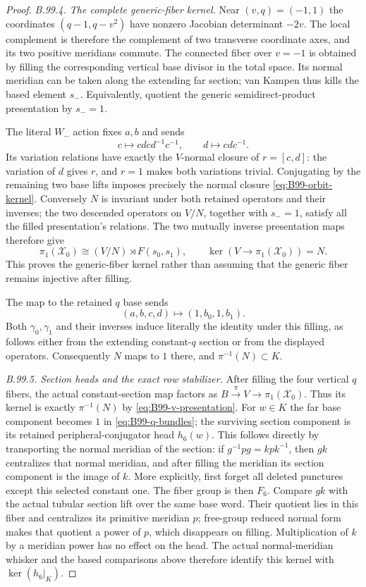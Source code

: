 \begin{proof}
\emph{B.99.4. The complete generic-fiber kernel.}
Near $(v,q)=(-1,1)$ the coordinates
$(q-1,q-v^2)$ have nonzero Jacobian determinant $-2v$.
The local complement is therefore the complement of two transverse
coordinate axes, and its two positive meridians commute.
The connected fiber over $v=-1$ is obtained by filling the corresponding
vertical base divisor in the total space.
Its normal meridian can be taken along the extending far section;
van Kampen thus kills the based element $s_-$.
Equivalently, quotient the generic semidirect-product presentation
by $s_-=1$.

The literal $W_-$ action fixes $a,b$ and sends
\[
 c\longmapsto cdc d^{-1}c^{-1},\qquad
 d\longmapsto cdc^{-1}.
\]
Its variation relations have exactly the $V$-normal closure of
$r=[c,d]$: the variation of $d$ gives $r$, and $r=1$ makes both
variations trivial.
Conjugating by the remaining two base lifts imposes precisely the
normal closure \eqref{eq:B99-orbit-kernel}.
Conversely $N$ is invariant under both retained operators and their
inverses; the two descended operators on $V/N$, together with
$s_-=1$, satisfy all the filled presentation's relations.
The two mutually inverse presentation maps therefore give
\begin{equation}\label{eq:B99-v-presentation}
 \pi_1(\mathscr X_0)\cong (V/N)\rtimes F(s_0,s_1),
 \qquad \ker(V\to\pi_1(\mathscr X_0))=N.
\end{equation}
This proves the generic-fiber kernel rather than assuming that
the generic fiber remains injective after filling.

The map to the retained $q$ base sends
\[
 (a,b,c,d)\longmapsto(1,b_0,1,b_1).
\]
Both $\gamma_0,\gamma_1$ and their inverses induce literally the
identity under this filling, as follows either from the extending
constant-$q$ section or from the displayed operators.
Consequently $N$ maps to $1$ there, and $\pi^{-1}(N)\subset K$.

\emph{B.99.5. Section heads and the exact row stabilizer.}
After filling the four vertical $q$ fibers, the actual constant-section
map factors as $B\xrightarrow{\pi}V\to\pi_1(\mathscr X_0)$.
Thus its kernel is exactly $\pi^{-1}(N)$ by
\eqref{eq:B99-v-presentation}.
For $w\in K$ the far base component becomes $1$ in
\eqref{eq:B99-q-bundles}; the surviving section component is its
retained peripheral-conjugator head $h_6(w)$.
This follows directly by transporting the normal meridian of the
section: if $g^{-1}pg=kpk^{-1}$, then $gk$ centralizes that
normal meridian, and after filling the meridian its section component
is the image of $k$.
More explicitly, first forget all deleted punctures except this selected
constant one.  The fiber group is then $F_6$.  Compare $gk$ with the
actual tubular section lift over the same base word.  Their quotient
lies in this fiber and centralizes its primitive meridian $p$;
free-group reduced normal form makes that quotient a power of $p$,
which disappears on filling.
Multiplication of $k$ by a meridian power has no effect on the head.
The actual normal-meridian whisker and the based comparisons above
therefore identify this kernel with $\ker(h_6|_K)$.


\end{proof}
